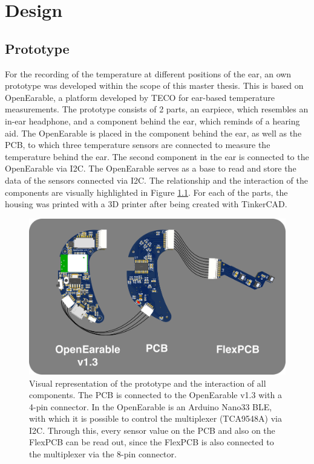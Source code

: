 \chapter{Design}
\label{ch:Design}

\section{Prototype}

For the recording of the temperature at different positions of the ear, an own prototype was developed within the scope of this master thesis.
This is based on OpenEarable, a platform developed by TECO for ear-based temperature measurements.
The prototype consists of 2 parts, an earpiece, which resembles an in-ear headphone, and a component behind the ear, which reminds of a hearing aid.
The OpenEarable is placed in the component behind the ear, as well as the PCB, to which three temperature sensors are connected to measure the temperature behind the ear.
The second component in the ear is connected to the OpenEarable via I2C.
The OpenEarable serves as a base to read and store the data of the sensors connected via I2C.
The relationship and the interaction of the components are visually highlighted in Figure \ref{fig:design:prototype_connection}.
For each of the parts, the housing was printed with a 3D printer after being created with TinkerCAD.

\begin{figure}[t]
    \centering
    \includegraphics[width=\textwidth]{thesis-doc/images/prototype/PrototypeConnection.png}
    \caption{Visual representation of the prototype and the interaction of all components. The PCB is connected to the OpenEarable v1.3 with a 4-pin connector. In the OpenEarable is an Arduino Nano33 BLE, with which it is possible to control the multiplexer (TCA9548A) via I2C. Through this, every sensor value on the PCB and also on the FlexPCB can be read out, since the FlexPCB is also connected to the multiplexer via the 8-pin connector.}
    \label{fig:design:prototype_connection}
\end{figure}

